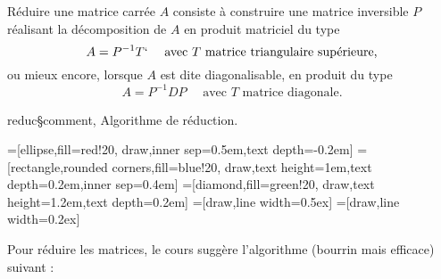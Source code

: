 R\'eduire une matrice carr\'ee $A$ consiste \`a construire une matrice inversible $P$ r\'ealisant la d\'ecomposition de $A$ en produit matriciel du type
\Equation [\bf Trigonalisation de $A$]
$$
A=P^{-1}T`\quad \mbox{ avec $T$ matrice triangulaire sup\'erieure,}
$$
ou mieux encore, lorsque $A$ est dite diagonalisable, en produit du type
\Equation [\bf Diagonalisation de $A$] 
$$
A=P^{-1}DP\quad \mbox{ avec $T$ matrice diagonale.}
$$

\Subsection reduc§comment, Algorithme de r\'eduction.

=[ellipse,fill=red!20, draw,inner sep=0.5em,text depth=-0.2em]
=[rectangle,rounded corners,fill=blue!20, draw,text height=1em,text depth=0.2em,inner sep=0.4em]
=[diamond,fill=green!20, draw,text height=1.2em,text depth=0.2em]
=[draw,line width=0.5ex]
=[draw,line width=0.2ex]

Pour r\'eduire les matrices, le cours sugg\`ere l'algorithme (bourrin mais efficace) suivant : 

